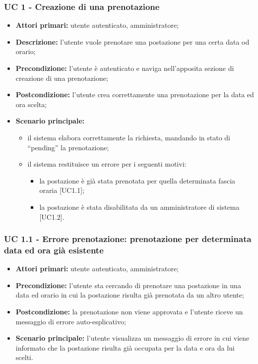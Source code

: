 \subsubsection{UC 1 - Creazione di una prenotazione}

\begin{itemize}
\item \textbf{Attori primari:} utente autenticato, amministratore;
\item \textbf{Descrizione:} l’utente vuole prenotare una postazione per una certa data od orario;
\item \textbf{Precondizione:} l’utente è autenticato e naviga nell’apposita sezione di creazione di una prenotazione;
\item \textbf{Postcondizione:} l’utente crea correttamente una prenotazione per la data ed ora scelta;
\item \textbf{Scenario principale:} 
	\begin{itemize}
		\item il sistema elabora correttamente la richiesta, mandando in stato di “pending” la prenotazione;
		\item il sistema restituisce un errore per i seguenti motivi:
		\begin{itemize}
			\item la postazione è già stata prenotata per quella determinata fascia oraria [UC1.1];
			\item la postazione è stata disabilitata da un amministratore di sistema [UC1.2].	
		\end{itemize}
	\end{itemize}
\end{itemize}

\subsubsection{UC 1.1 - Errore prenotazione: prenotazione per determinata data ed ora già esistente}
\begin{itemize}
\item \textbf{Attori primari:} utente autenticato, amministratore;
\item \textbf{Precondizione:} l'utente sta cercando di prenotare una postazione in una data ed orario in cui la postazione risulta già prenotata da un altro utente;
\item \textbf{Postcondizione:} la prenotazione non viene approvata e l'utente riceve un messaggio di errore auto-esplicativo;
\item \textbf{Scenario principale:} l'utente visualizza un messaggio di errore in cui viene informato che la postazione risulta già occupata per la data e ora da lui scelti.
\end{itemize}

